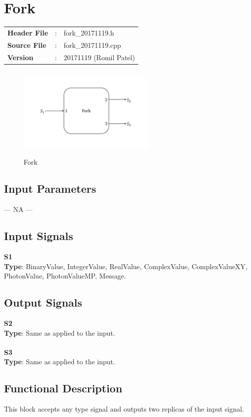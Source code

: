\clearpage

\section{Fork}

\begin{tcolorbox}	
\begin{tabular}{p{2.75cm} p{0.2cm} p{10.5cm}} 	
\textbf{Header File}   &:& fork\_20171119.h \\
\textbf{Source File}   &:& fork\_20171119.cpp \\
\textbf{Version}       &:& 20171119 (Romil Patel)
\end{tabular}
\end{tcolorbox}


\begin{figure}[h]
	\centering
	\includegraphics[width=0.6\textwidth, height=4.5cm]{./lib/fork/figures/fork.pdf}
	\caption{Fork}\label{}
\end{figure}

\subsection*{Input Parameters}

--- NA ---

\subsection*{Input Signals}

\textbf{S1}\\
\textbf{Type}: BinaryValue, IntegerValue, RealValue, ComplexValue, ComplexValueXY, PhotonValue, PhotonValueMP, Message.

\subsection*{Output Signals}

\textbf{S2}\\
\textbf{Type}: Same as applied to the input.\\
\\
\textbf{S3}\\
\textbf{Type}: Same as applied to the input.

\subsection*{Functional Description}

This block accepts any type signal and outputs two replicas of the input signal.
